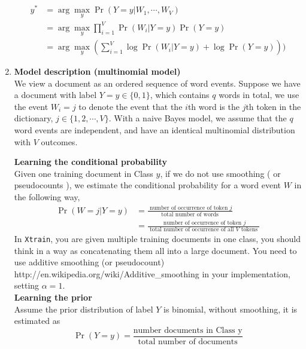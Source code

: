 \documentclass[11pt]{article}
\begin{document}
\begin{enumerate}
\begin{align*}
 y^* & = \arg\max_y \Pr(Y = y |W_1, \cdots, W_V)  \\
     & =  \arg\max_y  \prod_{i=1}^{V} \Pr( W_i| Y = y) \Pr( Y = y)\\
     & =  \arg\max_y  (\sum_{i=1}^{V} \log \Pr( W_i| Y = y) + \log \Pr( Y = y)))
\end{align*}
\fi

\item \textbf{Model description (multinomial model)}\\
We view a document as an ordered sequence of word events. 
Suppose we have a document with label $Y=y \in \{0,1\}$, which contains $q$ words in total, we use the event $W_i = j$ to denote the event that the $i$th word is the $j$th token in the dictionary, $j \in \{ 1,2, \cdots, V \}$. 
With a naive Bayes model, we assume that the $q$ word events are independent, and have an identical multinomial distribution with $V$ outcomes. 

\textbf{Learning the conditional probability}\\
Given one training document in Class $y$, if we do not use smoothing ( or pseudocounts ), we estimate the conditional probability for a word event $W$ in the following way,
\begin{align*}
\Pr( W = j| Y = y)  &= \frac{ \text{ number of occurrence of token $j$}}{ \text{ total number of words }} \\
&  = \frac{ \text{ number of occurrence of token $j$}}{ \text{ total number of occurrence of all $V$ tokens  }}
\end{align*}
In \texttt{Xtrain}, you are given multiple training documents in one class, you should think in a way as concatenating them all into a large document. 
You need to use additive smoothing (or pseudocount)
http://en.wikipedia.org/wiki/Additive\_smoothing in your implementation, setting $\alpha = 1$. \\

\textbf{Learning the prior}\\
Assume the prior distribution of label $Y$ is binomial, without smoothing, it is estimated as 
\[ \Pr(Y = y) = \frac{ \text{number documents in Class y}} { \text{total number of documents}}\] 



\end{enumerate}
\end{document}
